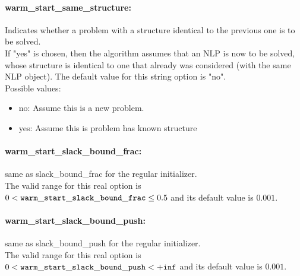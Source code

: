 \paragraph{warm\_start\_same\_structure:}\label{sec:warm_start_same_structure} Indicates whether a problem with a structure identical to the previous one is to be solved. $\;$ \\
 If "yes" is chosen, then the algorithm assumes
that an NLP is now to be solved, whose structure
is identical to one that already was considered
(with the same NLP object).
The default value for this string option is "no".
\\ 
Possible values:
\begin{itemize}
   \item no: Assume this is a new problem.
   \item yes: Assume this is problem has known structure
\end{itemize}

\paragraph{warm\_start\_slack\_bound\_frac:}\label{sec:warm_start_slack_bound_frac} same as slack\_bound\_frac for the regular initializer. $\;$ \\
 The valid range for this real option is 
$0 <  {\tt warm\_start\_slack\_bound\_frac } \le 0.5$
and its default value is $0.001$.


\paragraph{warm\_start\_slack\_bound\_push:}\label{sec:warm_start_slack_bound_push} same as slack\_bound\_push for the regular initializer. $\;$ \\
 The valid range for this real option is 
$0 <  {\tt warm\_start\_slack\_bound\_push } <  {\tt +inf}$
and its default value is $0.001$.


